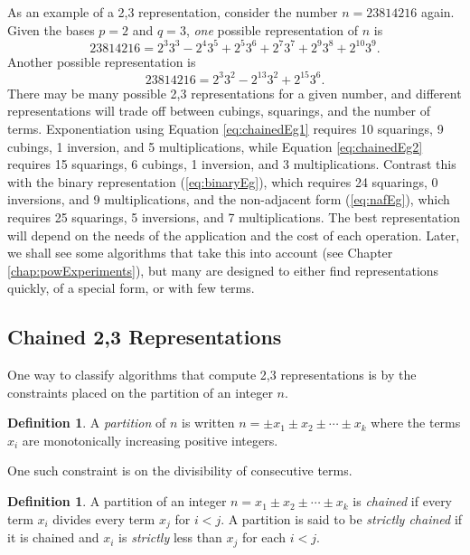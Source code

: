 \documentclass{ucalgthes1}
\theoremstyle{definition}
\newtheorem{defn}[thm]{Definition}
\begin{document}
As an example of a 2,3 representation, consider the number $n=23814216$ again.  Given the bases $p=2$ and $q=3$, \emph{one} possible representation of $n$ is
\begin{equation}
\label{eq:chainedEg1}
	23814216 = 2^3 3^3 - 2^4 3^5 + 2^5 3^6  + 2^7 3^7 + 2^9 3^8 + 2^{10} 3^9.
\end{equation}
Another possible representation is
\begin{equation}
\label{eq:chainedEg2}
	23814216 = 2^3 3^2 -2^{13} 3^2 +2^{15} 3^6.
\end{equation}
There may be many possible 2,3 representations for a given number, and different representations will trade off between cubings, squarings, and the number of terms.  Exponentiation using Equation \ref{eq:chainedEg1} requires 10 squarings, 9 cubings, 1 inversion, and 5 multiplications, while Equation \ref{eq:chainedEg2} requires 15 squarings, 6 cubings, 1 inversion, and 3 multiplications.  Contrast this with the binary representation (\ref{eq:binaryEg}), which requires 24 squarings, 0 inversions, and 9 multiplications, and the non-adjacent form (\ref{eq:nafEg}), which requires 25 squarings, 5 inversions, and 7 multiplications.  The best representation will depend on the needs of the application and the cost of each operation.  Later, we shall see some algorithms that take this into account (see Chapter \ref{chap:powExperiments}), but many are designed to either find representations quickly, of a special form, or with few terms.


\subsection{Chained 2,3 Representations}
\label{subsec:dbnsChains}

One way to classify algorithms that compute 2,3 representations is by the constraints placed on the partition of an integer $n$.

\begin{defn} \cite[\S 1]{Imbert2010}
A \emph{partition} of $n$ is written $n = \pm x_1 \pm x_2 \pm \cdots \pm x_k$ where the terms $x_i$ are monotonically increasing positive integers.
\end{defn}

\noindent
One such constraint is on the divisibility of consecutive terms.

\begin{defn}
\label{defn:chained} \cite[\S 1]{Imbert2010}
A partition of an integer $n = x_1 \pm x_2 \pm \cdots \pm x_k$ is \emph{chained} if every term $x_i$ divides every term $x_j$ for $i < j$. A partition is said to be \emph{strictly chained} if it is chained and $x_i$ is \emph{strictly} less than $x_j$ for each $i < j$.
\end{defn}
\end{document}
